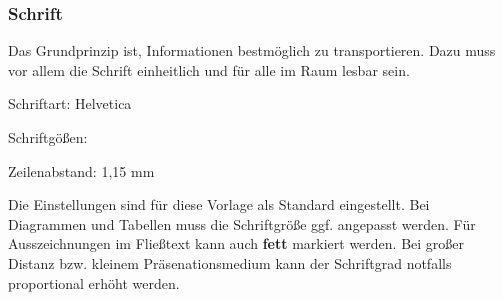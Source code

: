 \begin{frame}
    \frametitle{Schrift}

Das Grundprinzip ist, Informationen bestmöglich zu transportieren. Dazu muss
vor allem die Schrift einheitlich und für alle im Raum lesbar sein.

Schriftart: Helvetica

Schriftgößen: \PraesentationBeispieleSchriftgroessen

Zeilenabstand: 1,15 mm

Die Einstellungen sind für diese Vorlage als Standard eingestellt. Bei
Diagrammen und Tabellen muss die Schriftgröße ggf. angepasst werden. Für
Ausszeichnungen im Fließtext kann auch \textbf{fett} markiert werden. Bei
großer Distanz bzw. kleinem Präsenationsmedium kann der Schriftgrad notfalls
proportional erhöht werden.

\end{frame}
\clearpage


